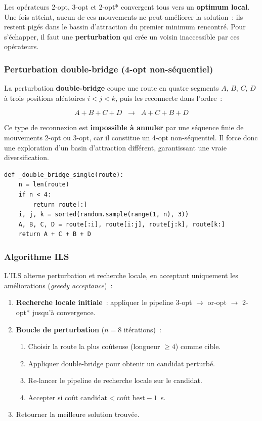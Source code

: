 \documentclass[a4paper, 12pt, twoside]{article}
\begin{document}
Les op\'{e}rateurs 2-opt, 3-opt et 2-opt* convergent tous vers un \textbf{optimum local}. Une fois atteint, aucun de ces mouvements ne peut am\'{e}liorer la solution~: ils restent pig\'{e}s dans le bassin d'attraction du premier minimum rencontr\'{e}. Pour s'\'{e}chapper, il faut une \textbf{perturbation} qui cr\'{e}e un voisin inaccessible par ces op\'{e}rateurs.

\subsubsection{Perturbation double-bridge (4-opt non-s\'{e}quentiel)}

La perturbation \textbf{double-bridge} coupe une route en quatre segments $A$, $B$, $C$, $D$ à trois positions aléatoires $i < j < k$, puis les reconnecte dans l'ordre~:

\[
A + B + C + D \;\;\longrightarrow\;\; A + C + B + D
\]

Ce type de reconnexion est \textbf{impossible à annuler} par une s\'{e}quence finie de mouvements 2-opt ou 3-opt, car il constitue un 4-opt non-s\'{e}quentiel. Il force donc une exploration d'un basin d'attraction diff\'{e}rent, garantissant une vraie diversification.

\begin{lstlisting}[caption={Double-bridge : 4-opt non-sequentiel}, label=lst:dbridge]
def _double_bridge_single(route):
    n = len(route)
    if n < 4:
        return route[:]
    i, j, k = sorted(random.sample(range(1, n), 3))
    A, B, C, D = route[:i], route[i:j], route[j:k], route[k:]
    return A + C + B + D
\end{lstlisting}

\subsubsection{Algorithme ILS}

L'ILS alterne perturbation et recherche locale, en acceptant uniquement les am\'{e}liorations (\textit{greedy acceptance})~:

\begin{enumerate}
  \item \textbf{Recherche locale initiale}~: appliquer le pipeline 3-opt $\to$ or-opt $\to$ 2-opt* jusqu'\`{a} convergence.
  \item \textbf{Boucle de perturbation} ($n = 8$ it\'{e}rations)~:
    \begin{enumerate}
      \item Choisir la route la plus co\^{u}teuse (longueur $\geq 4$) comme cible.
      \item Appliquer double-bridge pour obtenir un candidat perturb\'{e}.
      \item Re-lancer le pipeline de recherche locale sur le candidat.
      \item Accepter si $\text{co\^{u}t candidat} < \text{co\^{u}t best} - 1$~s.
    \end{enumerate}
  \item Retourner la meilleure solution trouv\'{e}e.
\end{enumerate}
\end{document}
